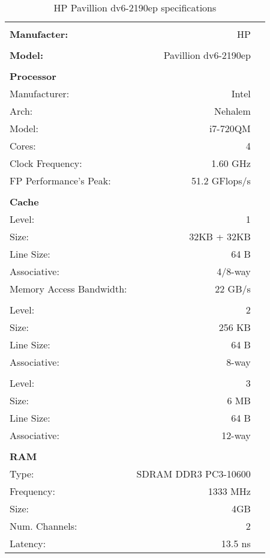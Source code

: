 \documentclass[a4paper,10pt,openright,openbib]{article}
\begin{document}
\begin{table}[!htp]
		\begin{tabular}{lrl}
			\hline \\
			\textbf{Manufacter:} & HP \\
			\hline \\
			\textbf{Model:} & Pavillion dv6-2190ep \\
			\hline \\
			\textbf{Processor} & & \\
			Manufacturer: & Intel & \\
			Arch: & Nehalem & \\
			Model: & i7-720QM & \\
			Cores: & 4 & \\
			Clock Frequency: & 1.60 GHz & \\
			FP Performance's Peak: & 51.2 GFlops/s & \\
			\hline \\
			\textbf{Cache} & & \\
			Level: & 1 & \\
			Size: & 32KB + 32KB & \\
			Line Size: & 64 B & \\
			Associative: & 4/8-way & \\
			Memory Access Bandwidth: & 22 GB/s & \\
			\\
			Level: & 2 & \\
			Size: & 256 KB & \\
			Line Size: & 64 B & \\
			Associative: & 8-way & \\
			\\
			Level: & 3 & \\
			Size: & 6 MB & \\
			Line Size: & 64 B & \\
			Associative: & 12-way & \\
			\hline \\
			\textbf{RAM} \\
			Type: & SDRAM DDR3 PC3-10600 & \\
			Frequency: & 1333 MHz & \\
			Size: & 4GB & \\
			Num. Channels: & 2 & \\
			Latency: & 13.5 ns & \\
		\end{tabular}
		\caption{HP Pavillion dv6-2190ep specifications}
		\label{tab:hp}
\end{table}
\end{document}
